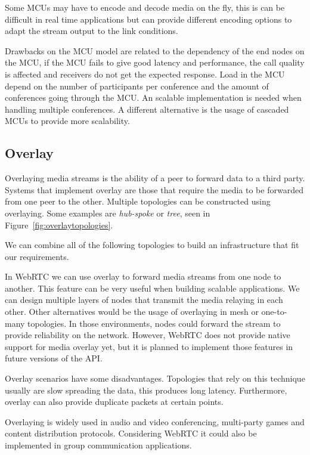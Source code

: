Some MCUs may have to encode and decode media on the fly, this is can be difficult in real time applications but can provide different encoding options to adapt the stream output to the link conditions. 

Drawbacks on the MCU model are related to the dependency of the end nodes on the MCU, if the MCU fails to give good latency and performance, the call quality is affected and receivers do not get the expected response. Load in the MCU depend on the number of participants per conference and the amount of conferences going through the MCU. An scalable implementation is needed when handling multiple conferences. A different alternative is the usage of cascaded MCUs to provide more scalability.  

\subsection{Overlay}

Overlaying media streams is the ability of a peer to forward data to a third party. Systems that implement overlay are those that require the media to be forwarded from one peer to the other. Multiple topologies can be constructed using overlaying. Some examples are {\it hub-spoke} or {\it tree}, seen in Figure~\ref{fig:overlaytopologies}.

We can combine all of the following topologies to build an infrastructure that fit our requirements. 

In WebRTC we can use overlay to forward media streams from one node to another. This feature can be very useful when building scalable applications. We can design multiple layers of nodes that transmit the media relaying in each other. Other alternatives would be the usage of overlaying in mesh or one-to-many topologies. In those environments, nodes could forward the stream to provide reliability on the network. However, WebRTC does not provide native support for media overlay yet, but it is planned to implement those features in future versions of the API.

Overlay scenarios have some disadvantages. Topologies that rely on this technique usually are slow spreading the data, this produces long latency. Furthermore, overlay can also provide duplicate packets at certain points.

Overlaying is widely used in audio and video conferencing, multi-party games and content distribution protocols. Considering WebRTC it could also be implemented in group communication applications. 
 
